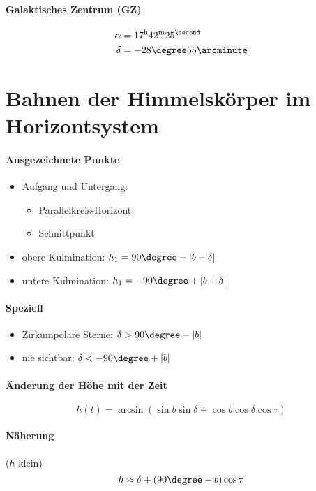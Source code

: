 \paragraph{Galaktisches Zentrum (GZ)}
\begin{align*}
    \alpha &= 17^\mathrm{h}42^\mathrm{m}25^\second \\
    \delta &= -28\degree 55\arcminute
\end{align*}

\section{Bahnen der Himmelskörper im Horizontsystem}
\begin{center}
\end{center}
\paragraph{Ausgezeichnete Punkte}
\begin{itemize}
    \item Aufgang und Untergang:
        \begin{itemize}
            \item Parallelkreis-Horizont
            \item Schnittpunkt
        \end{itemize}
    \item obere Kulmination: $h_1 = 90\degree - |b - \delta|$
    \item untere Kulmination: $h_1 = -90\degree + |b + \delta|$
\end{itemize}

\paragraph{Speziell}
\begin{itemize}
    \item Zirkumpolare Sterne: $\delta > 90\degree - |b|$
    \item nie sichtbar: $\delta < -90\degree + |b|$
\end{itemize}

\paragraph{Änderung der Höhe mit der Zeit}
\[ h(t) = \arcsin(\sin b \sin \delta + \cos b \cos \delta \cos \tau) \]

\paragraph{Näherung} ($h$ klein)
\[ h \approx \delta + (90\degree - b) \cos \tau \]

